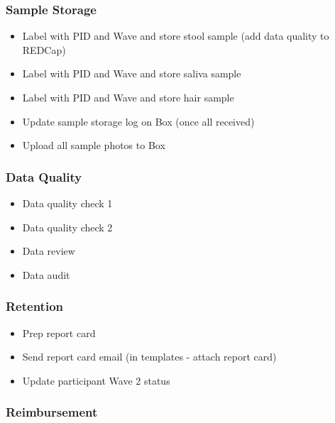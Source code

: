 \documentclass[
]{book}
\providecommand{\tightlist}{%
  \setlength{\itemsep}{0pt}\setlength{\parskip}{0pt}}
\begin{document}
\hypertarget{sample-storage-2}{%
\subsubsection{Sample Storage}\label{sample-storage-2}}

\begin{itemize}
\tightlist
\item
  Label with PID and Wave and store stool sample (add data quality to REDCap)
\item
  Label with PID and Wave and store saliva sample
\item
  Label with PID and Wave and store hair sample
\item
  Update sample storage log on Box (once all received)
\item
  Upload all sample photos to Box
\end{itemize}

\hypertarget{data-quality-1}{%
\subsubsection{Data Quality}\label{data-quality-1}}

\begin{itemize}
\tightlist
\item
  Data quality check 1
\item
  Data quality check 2
\item
  Data review
\item
  Data audit
\end{itemize}

\hypertarget{retention-1}{%
\subsubsection{Retention}\label{retention-1}}

\begin{itemize}
\tightlist
\item
  Prep report card
\item
  Send report card email (in templates - attach report card)
\item
  Update participant Wave 2 status
\end{itemize}

\hypertarget{reimbursement-1}{%
\subsubsection{Reimbursement}\label{reimbursement-1}}
\end{document}
